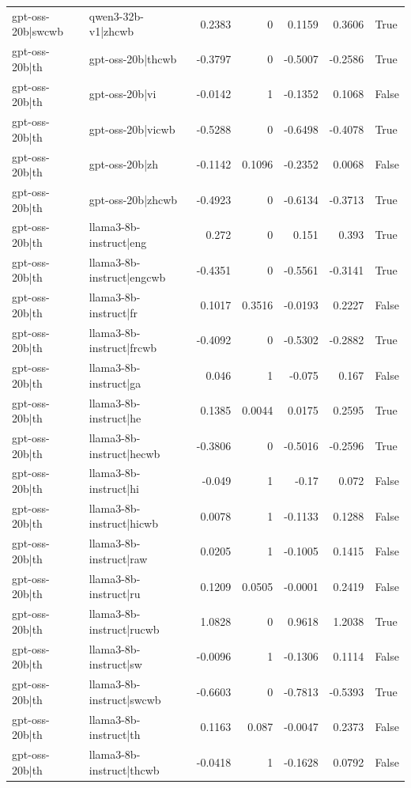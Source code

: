 \begin{table}
\begin{tabular}{l l r r r r l}
gpt-oss-20b|swcwb & qwen3-32b-v1|zhcwb & 0.2383 & 0 & 0.1159 & 0.3606 & True \\
gpt-oss-20b|th & gpt-oss-20b|thcwb & -0.3797 & 0 & -0.5007 & -0.2586 & True \\
gpt-oss-20b|th & gpt-oss-20b|vi & -0.0142 & 1 & -0.1352 & 0.1068 & False \\
gpt-oss-20b|th & gpt-oss-20b|vicwb & -0.5288 & 0 & -0.6498 & -0.4078 & True \\
gpt-oss-20b|th & gpt-oss-20b|zh & -0.1142 & 0.1096 & -0.2352 & 0.0068 & False \\
gpt-oss-20b|th & gpt-oss-20b|zhcwb & -0.4923 & 0 & -0.6134 & -0.3713 & True \\
gpt-oss-20b|th & llama3-8b-instruct|eng & 0.272 & 0 & 0.151 & 0.393 & True \\
gpt-oss-20b|th & llama3-8b-instruct|engcwb & -0.4351 & 0 & -0.5561 & -0.3141 & True \\
gpt-oss-20b|th & llama3-8b-instruct|fr & 0.1017 & 0.3516 & -0.0193 & 0.2227 & False \\
gpt-oss-20b|th & llama3-8b-instruct|frcwb & -0.4092 & 0 & -0.5302 & -0.2882 & True \\
gpt-oss-20b|th & llama3-8b-instruct|ga & 0.046 & 1 & -0.075 & 0.167 & False \\
gpt-oss-20b|th & llama3-8b-instruct|he & 0.1385 & 0.0044 & 0.0175 & 0.2595 & True \\
gpt-oss-20b|th & llama3-8b-instruct|hecwb & -0.3806 & 0 & -0.5016 & -0.2596 & True \\
gpt-oss-20b|th & llama3-8b-instruct|hi & -0.049 & 1 & -0.17 & 0.072 & False \\
gpt-oss-20b|th & llama3-8b-instruct|hicwb & 0.0078 & 1 & -0.1133 & 0.1288 & False \\
gpt-oss-20b|th & llama3-8b-instruct|raw & 0.0205 & 1 & -0.1005 & 0.1415 & False \\
gpt-oss-20b|th & llama3-8b-instruct|ru & 0.1209 & 0.0505 & -0.0001 & 0.2419 & False \\
gpt-oss-20b|th & llama3-8b-instruct|rucwb & 1.0828 & 0 & 0.9618 & 1.2038 & True \\
gpt-oss-20b|th & llama3-8b-instruct|sw & -0.0096 & 1 & -0.1306 & 0.1114 & False \\
gpt-oss-20b|th & llama3-8b-instruct|swcwb & -0.6603 & 0 & -0.7813 & -0.5393 & True \\
gpt-oss-20b|th & llama3-8b-instruct|th & 0.1163 & 0.087 & -0.0047 & 0.2373 & False \\
gpt-oss-20b|th & llama3-8b-instruct|thcwb & -0.0418 & 1 & -0.1628 & 0.0792 & False \\

\end{tabular}
\end{table}
